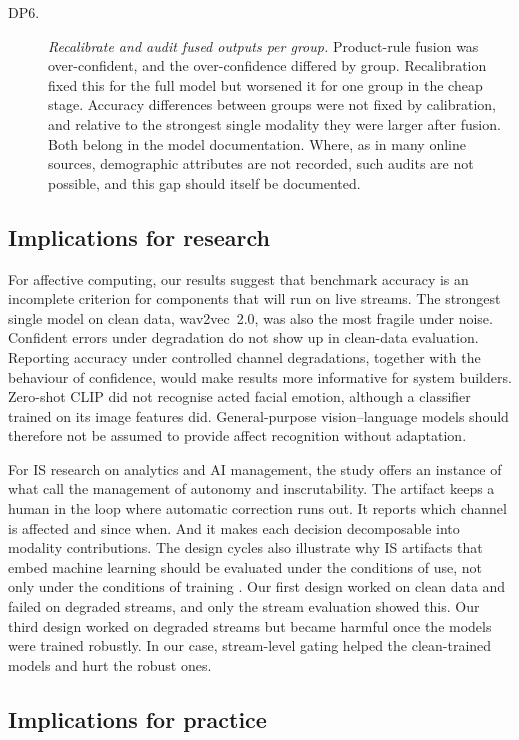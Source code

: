 \begin{description}
\item[DP6.] \emph{Recalibrate and audit fused outputs per group.} Product-rule fusion was over-confident, and the over-confidence differed by group. Recalibration fixed this for the full model but worsened it for one group in the cheap stage. Accuracy differences between groups were not fixed by calibration, and relative to the strongest single modality they were larger after fusion. Both belong in the model documentation. Where, as in many online sources, demographic attributes are not recorded, such audits are not possible, and this gap should itself be documented.
\end{description}

\subsection{Implications for research}

For affective computing, our results suggest that benchmark accuracy is an incomplete criterion for components that will run on live streams. The strongest single model on clean data, wav2vec~2.0, was also the most fragile under noise. Confident errors under degradation do not show up in clean-data evaluation. Reporting accuracy under controlled channel degradations, together with the behaviour of confidence, would make results more informative for system builders. Zero-shot CLIP did not recognise acted facial emotion, although a classifier trained on its image features did. General-purpose vision--language models should therefore not be assumed to provide affect recognition without adaptation.

For IS research on analytics and AI management, the study offers an instance of what \citet{berente2021} call the management of autonomy and inscrutability. The artifact keeps a human in the loop where automatic correction runs out. It reports which channel is affected and since when. And it makes each decision decomposable into modality contributions. The design cycles also illustrate why IS artifacts that embed machine learning should be evaluated under the conditions of use, not only under the conditions of training \citep{shmueli2011}. Our first design worked on clean data and failed on degraded streams, and only the stream evaluation showed this. Our third design worked on degraded streams but became harmful once the models were trained robustly. In our case, stream-level gating helped the clean-trained models and hurt the robust ones.

\subsection{Implications for practice}

